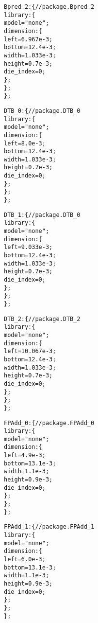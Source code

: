 {\begin{alltt}
            Bpred\_2: \{ // package.Bpred\_2
                library: \{
                    model = "none";
                    dimension: \{
                        left = 6.967e-3;
                        bottom = 12.4e-3;
                        width = 1.033e-3;
                        height = 0.7e-3;
                        die_index = 0;
                    \};
                \};
            \};

            DTB\_0: \{ // package.DTB\_0
                library: \{
                    model = "none";
                    dimension: \{
                        left = 8.0e-3;
                        bottom = 12.4e-3;
                        width = 1.033e-3;
                        height = 0.7e-3;
                        die_index = 0;
                    \};
                \};
            \};

            DTB\_1: \{ // package.DTB\_0
                library: \{
                    model = "none";
                    dimension: \{
                        left = 9.033e-3;
                        bottom = 12.4e-3;
                        width = 1.033e-3;
                        height = 0.7e-3;
                        die_index = 0;
                    \};
                \};
            \};
            
            DTB\_2: \{ // package.DTB\_2
                library: \{
                    model = "none";
                    dimension: \{
                        left = 10.067e-3;
                        bottom = 12.4e-3;
                        width = 1.033e-3;
                        height = 0.7e-3;
                        die_index = 0;
                    \};
                \};
            \};

            FPAdd\_0: \{ // package.FPAdd\_0
                library: \{
                    model = "none";
                    dimension: \{
                        left = 4.9e-3;
                        bottom = 13.1e-3;
                        width = 1.1e-3;
                        height = 0.9e-3;
                        die_index = 0;
                    \};
                \};
            \};

            FPAdd\_1: \{ // package.FPAdd\_1
                library: \{
                    model = "none";
                    dimension: \{
                        left = 6.0e-3;
                        bottom = 13.1e-3;
                        width = 1.1e-3;
                        height = 0.9e-3;
                        die_index = 0;
                    \};
                \};
            \};
            

\end{alltt}}
